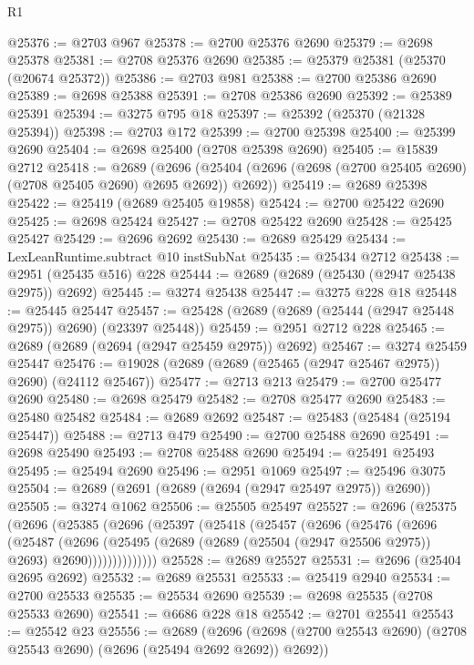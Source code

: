 \begin{lexlean}{R1}
\begin{coremodule}
@25376 := @2703 @967
@25378 := @2700 @25376 @2690
@25379 := @2698 @25378
@25381 := @2708 @25376 @2690
@25385 := @25379 @25381 (@25370 (@20674 @25372))
@25386 := @2703 @981
@25388 := @2700 @25386 @2690
@25389 := @2698 @25388
@25391 := @2708 @25386 @2690
@25392 := @25389 @25391
@25394 := @3275 @795 @18
@25397 := @25392 (@25370 (@21328 @25394))
@25398 := @2703 @172
@25399 := @2700 @25398
@25400 := @25399 @2690
@25404 := @2698 @25400 (@2708 @25398 @2690)
@25405 := @15839 @2712
@25418 := @2689
    (@2696 (@25404 (@2696 (@2698 (@2700 @25405 @2690) (@2708 @25405 @2690) @2695 @2692)) @2692))
@25419 := @2689 @25398
@25422 := @25419 (@2689 @25405 @19858)
@25424 := @2700 @25422 @2690
@25425 := @2698 @25424
@25427 := @2708 @25422 @2690
@25428 := @25425 @25427
@25429 := @2696 @2692
@25430 := @2689 @25429
@25434 := LexLeanRuntime.subtract @10 instSubNat
@25435 := @25434 @2712
@25438 := @2951 (@25435 @516) @228
@25444 := @2689 (@2689 (@25430 (@2947 @25438 @2975)) @2692)
@25445 := @3274 @25438
@25447 := @3275 @228 @18
@25448 := @25445 @25447
@25457 := @25428 (@2689 (@2689 (@25444 (@2947 @25448 @2975)) @2690) (@23397 @25448))
@25459 := @2951 @2712 @228
@25465 := @2689 (@2689 (@2694 (@2947 @25459 @2975)) @2692)
@25467 := @3274 @25459 @25447
@25476 := @19028 (@2689 (@2689 (@25465 (@2947 @25467 @2975)) @2690) (@24112 @25467))
@25477 := @2713 @213
@25479 := @2700 @25477 @2690
@25480 := @2698 @25479
@25482 := @2708 @25477 @2690
@25483 := @25480 @25482
@25484 := @2689 @2692
@25487 := @25483 (@25484 (@25194 @25447))
@25488 := @2713 @479
@25490 := @2700 @25488 @2690
@25491 := @2698 @25490
@25493 := @2708 @25488 @2690
@25494 := @25491 @25493
@25495 := @25494 @2690
@25496 := @2951 @1069
@25497 := @25496 @3075
@25504 := @2689 (@2691 (@2689 (@2694 (@2947 @25497 @2975)) @2690))
@25505 := @3274 @1062
@25506 := @25505 @25497
@25527 := @2696
    (@25375
      (@2696
        (@25385
          (@2696
            (@25397
              (@25418
                (@25457
                  (@2696
                    (@25476
                      (@2696
                        (@25487
                          (@2696
                            (@25495
                              (@2689 (@2689 (@25504 (@2947 @25506 @2975)) @2693) @2690))))))))))))))
@25528 := @2689 @25527
@25531 := @2696 (@25404 @2695 @2692)
@25532 := @2689 @25531
@25533 := @25419 @2940
@25534 := @2700 @25533
@25535 := @25534 @2690
@25539 := @2698 @25535 (@2708 @25533 @2690)
@25541 := @6686 @228 @18
@25542 := @2701 @25541
@25543 := @25542 @23
@25556 := @2689
    (@2696 (@2698 (@2700 @25543 @2690) (@2708 @25543 @2690) (@2696 (@25494 @2692 @2692)) @2692))

\end{coremodule}
\end{lexlean}

